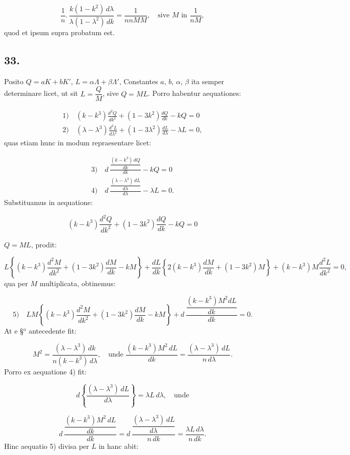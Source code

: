 \documentclass{article}
\begin{document}
\[
\frac{1}{n}.\,\frac{k(1-k^{2})\,d\lambda}{\lambda(1-\lambda^{2})\,dk}=\frac{1}{nnMM},\quad\text{sive }M\text{ in }\frac{1}{nM},
\]
quod et ipsum supra probatum est.

\subsection*{33.}

Posito $Q=aK+bK'$, $L=\alpha\Lambda+\beta\Lambda'$, Constantes $a$, $b$, $\alpha$, $\beta$ ita semper determinare licet, ut sit $L=\dfrac{Q}{M}$, sive $Q=ML$. Porro habentur aequationes:

\[
\begin{gathered}
\text{1)}\quad(k-k^{3})\frac{d^{2}Q}{dk^{2}}+(1-3k^{2})\frac{dQ}{dk}-kQ=0\\[1.5ex]
\text{2)}\quad(\lambda-\lambda^{3})\frac{d^{2}L}{d\lambda^{2}}+(1-3\lambda^{2})\frac{dL}{d\lambda}-\lambda L=0,
\end{gathered}
\]
quas etiam hunc in modum repraesentare licet:

\[
\begin{gathered}
\text{3)}\quad d\,\frac{\dfrac{(k-k^{3})\,dQ}{dk}}{dk}-kQ=0\\[2ex]
\text{4)}\quad d\,\frac{\dfrac{(\lambda-\lambda^{3})\,dL}{d\lambda}}{d\lambda}-\lambda L=0.
\end{gathered}
\]
Substituamus in aequatione:

\[
(k-k^{3})\frac{d^{2}Q}{dk^{2}}+(1-3k^{2})\frac{dQ}{dk}-kQ=0
\]

$Q=ML$, prodit:

\[
L\left\{(k-k^{3})\frac{d^{2}M}{dk^{2}}+(1-3k^{2})\frac{dM}{dk}-kM\right\}+\frac{dL}{dk}\left\{2(k-k^{3})\frac{dM}{dk}+(1-3k^{2})M\right\}+(k-k^{3})M\frac{d^{2}L}{dk^{2}}=0,
\]
qua per $M$ multiplicata, obtinemus:

\[
\text{5)}\quad LM\left\{(k-k^{3})\frac{d^{2}M}{dk^{2}}+(1-3k^{2})\frac{dM}{dk}-kM\right\}+d\,\frac{\dfrac{(k-k^{3})M^{2}dL}{dk}}{dk}=0.
\]
At e §$^{\mathrm{o}}$ antecedente fit:

\[
M^{2}=\frac{(\lambda-\lambda^{3})\,dk}{n(k-k^{3})\,d\lambda},\quad\text{unde }\frac{(k-k^{3})M^{2}\,dL}{dk}=\frac{(\lambda-\lambda^{3})\,dL}{n\,d\lambda}.
\]
Porro ex aequatione 4) fit:

\[
d\left\{\frac{(\lambda-\lambda^{3})\,dL}{d\lambda}\right\}=\lambda L\,d\lambda,\quad\text{unde}
\]

\[
d\,\frac{\dfrac{(k-k^{3})M^{2}\,dL}{dk}}{dk}=d\,\frac{\dfrac{(\lambda-\lambda^{3})\,dL}{d\lambda}}{n\,dk}=\frac{\lambda L\,d\lambda}{n\,dk}.
\]
Hinc aequatio 5) divisa per $L$ in hanc abit:
\end{document}
